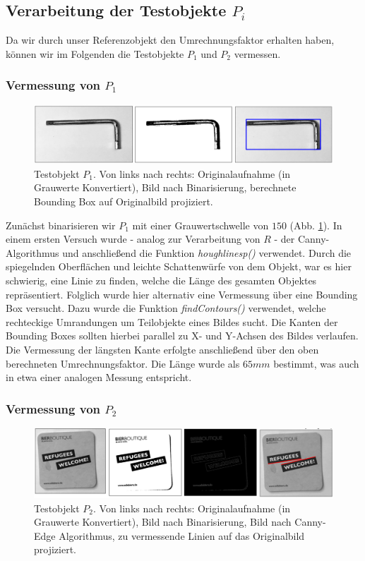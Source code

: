 \documentclass{article}
\begin{document}
\subsection{Verarbeitung der Testobjekte $P_{i}$}

Da wir durch unser Referenzobjekt den Umrechnungsfaktor erhalten haben, können wir im Folgenden die Testobjekte $P_{1}$ und $P_{2}$ vermessen.

\subsubsection{Vermessung von $P_{1}$}

\begin{figure}
    \centering
    \includegraphics[width=4.5in]{FigProbe1.png}
    \caption{Testobjekt $P_{1}$. Von links nach rechts: Originalaufnahme (in Grauwerte Konvertiert), Bild nach Binarisierung, berechnete Bounding Box auf Originalbild projiziert.}
    \label{fig:fig2}
\end{figure}


Zunächst binarisieren wir $P_{1}$ mit einer Grauwertschwelle von $150$ (Abb. \ref{fig:fig2}). In einem ersten Versuch wurde - analog zur Verarbeitung von $R$ - der Canny-Algorithmus und anschließend die Funktion \textit{houghlinesp()} verwendet. Durch die spiegelnden Oberflächen und leichte Schattenwürfe von dem Objekt, war es hier schwierig, eine Linie zu finden, welche die Länge des gesamten Objektes repräsentiert. Folglich wurde hier alternativ eine Vermessung über eine Bounding Box versucht. Dazu wurde die Funktion \textit{findContours()} verwendet, welche rechteckige Umrandungen um Teilobjekte eines Bildes sucht. Die Kanten der Bounding Boxes sollten hierbei parallel zu X- und Y-Achsen des Bildes verlaufen. Die Vermessung der längsten Kante erfolgte anschließend über den oben berechneten Umrechnungsfaktor. Die Länge wurde als $65mm$ bestimmt, was auch in etwa einer analogen Messung entspricht.

\subsubsection{Vermessung von $P_{2}$}

\begin{figure}
    \centering
    \includegraphics[width=4.5in]{FigProbe2.png}
    \caption{Testobjekt $P_{2}$. Von links nach rechts: Originalaufnahme (in Grauwerte Konvertiert), Bild nach Binarisierung, Bild nach Canny-Edge Algorithmus, zu vermessende Linien auf das Originalbild projiziert.}
    \label{fig:fig3}
\end{figure}
\end{document}
